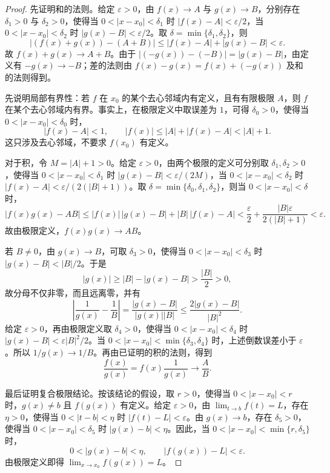 \documentclass[UTF8,fontset=fandol,11pt]{ctexart}
\begin{document}
\begin{proof}
先证明和的法则。给定 $\varepsilon>0$，由 $f(x)\to A$ 与 $g(x)\to B$，分别存在 $\delta_1>0$ 与 $\delta_2>0$，使得当 $0<|x-x_0|<\delta_1$ 时 $|f(x)-A|<\varepsilon/2$，当 $0<|x-x_0|<\delta_2$ 时 $|g(x)-B|<\varepsilon/2$。取 $\delta=\min\{\delta_1,\delta_2\}$，则
\[
\left|(f(x)+g(x))-(A+B)\right|\leq |f(x)-A|+|g(x)-B|<\varepsilon.
\]
故 $f(x)+g(x)\to A+B$。由于 $|(-g(x))-(-B)|=|g(x)-B|$，由定义有 $-g(x)\to-B$；差的法则由 $f(x)-g(x)=f(x)+(-g(x))$ 及和的法则得到。

先说明局部有界性：若 $f$ 在 $x_0$ 的某个去心邻域内有定义，且有有限极限 $A$，则 $f$ 在某个去心邻域内有界。事实上，在极限定义中取误差为 $1$，可得 $\delta_0>0$，使得当 $0<|x-x_0|<\delta_0$ 时，
\[
|f(x)-A|<1,\qquad |f(x)|\leq |A|+|f(x)-A|<|A|+1.
\]
这只涉及去心邻域，不要求 $f(x_0)$ 有定义。

对于积，令 $M=|A|+1>0$。给定 $\varepsilon>0$，由两个极限的定义可分别取 $\delta_1,\delta_2>0$，使得当 $0<|x-x_0|<\delta_1$ 时 $|g(x)-B|<\varepsilon/(2M)$，当 $0<|x-x_0|<\delta_2$ 时 $|f(x)-A|<\varepsilon/(2(|B|+1))$。取 $\delta=\min\{\delta_0,\delta_1,\delta_2\}$，则当 $0<|x-x_0|<\delta$ 时，
\[
|f(x)g(x)-AB|\leq |f(x)|\,|g(x)-B|+|B|\,|f(x)-A|
<\frac{\varepsilon}{2}+\frac{|B|\varepsilon}{2(|B|+1)}<\varepsilon.
\]
故由极限定义，$f(x)g(x)\to AB$。

若 $B\neq0$，由 $g(x)\to B$，可取 $\delta_3>0$，使得当 $0<|x-x_0|<\delta_3$ 时 $|g(x)-B|<|B|/2$。于是
\[
|g(x)|\geq |B|-|g(x)-B|>\frac{|B|}{2}>0,
\]
故分母不仅非零，而且远离零，并有
\[
\left|\frac{1}{g(x)}-\frac{1}{B}\right|=\frac{|g(x)-B|}{|g(x)||B|}\leq\frac{2|g(x)-B|}{|B|^2}.
\]
给定 $\varepsilon>0$，再由极限定义取 $\delta_4>0$，使得当 $0<|x-x_0|<\delta_4$ 时 $|g(x)-B|<\varepsilon|B|^2/2$。当 $0<|x-x_0|<\min\{\delta_3,\delta_4\}$ 时，上述倒数误差小于 $\varepsilon$。所以 $1/g(x)\to1/B$。再由已证明的积的法则，得到
\[
\frac{f(x)}{g(x)}=f(x)\frac{1}{g(x)}\to\frac{A}{B}.
\]

最后证明复合极限结论。按该结论的假设，取 $r>0$，使得当 $0<|x-x_0|<r$ 时，$g(x)\neq b$ 且 $f(g(x))$ 有定义。给定 $\varepsilon>0$，由 $\lim_{t\to b}f(t)=L$，存在 $\eta>0$，使得当 $0<|t-b|<\eta$ 时 $|f(t)-L|<\varepsilon$。由 $g(x)\to b$，存在 $\delta_5>0$，使得当 $0<|x-x_0|<\delta_5$ 时 $|g(x)-b|<\eta$。因此，当 $0<|x-x_0|<\min\{r,\delta_5\}$ 时，
\[
0<|g(x)-b|<\eta,\qquad |f(g(x))-L|<\varepsilon.
\]
由极限定义即得 $\lim_{x\to x_0}f(g(x))=L$。
\end{proof}
\end{document}
